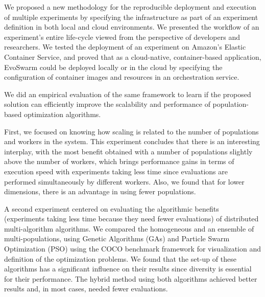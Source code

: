 \documentclass[review]{elsarticle}
\begin{document}
We proposed a new methodology for the reproducible deployment and execution of
multiple experiments by specifying the infrastructure as part of an experiment
definition in both local and cloud environments. We presented the workflow of an
experiment's entire life-cycle viewed from the perspective of developers and
researchers. 
We tested the deployment of an experiment on Amazon's Elastic
Container Service, and proved that as a cloud-native, container-based application,
EvoSwarm could be deployed locally or in the cloud by specifying the configuration 
of container images and resources in an orchestration service.

We did an empirical evaluation of the same framework to learn if the proposed
solution can efficiently improve the scalability and performance of
population-based optimization algorithms.

First, we focused on knowing how scaling is related to the number of populations
and workers in the system. This experiment concludes that there is an
interesting interplay, with the most benefit obtained with a number of
populations slightly above the number of workers, which brings performance gains 
in terms of execution speed with experiments taking less time since
evaluations are performed simultaneously by different workers.
Also, we found that for lower dimensions, there is an advantage in using fewer
populations. %

A second experiment centered on evaluating the algorithmic benefits (experiments
taking less time because they need fewer evaluations) of distributed
multi-algorithm algorithms. We compared the homogeneous and an ensemble of
multi-populations, using Genetic Algorithms (GAs) and Particle Swarm
Optimization (PSO) using the COCO benchmark framework 
for visualization and definition of the optimization problems.
We found that the set-up of these algorithms has a significant influence on
their results since diversity is essential for their performance. The
hybrid method using both algorithms 
achieved better results and, in most cases, needed fewer evaluations.


\end{document}

